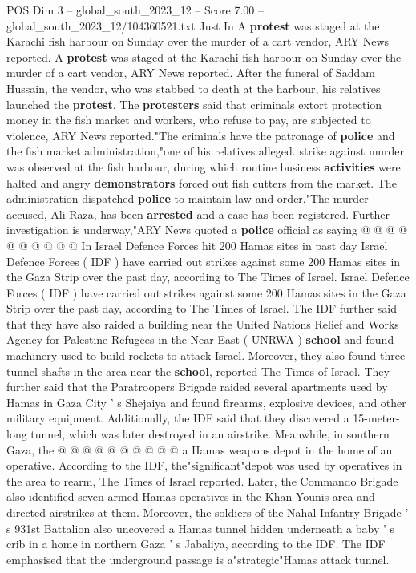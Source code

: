 \begin{textsample}{POS Dim 3 – global\_south\_2023\_12 – Score 7.00 – global\_south\_2023\_12/104360521.txt}  \label{ex:f3_pos_424}
Just In A \textbf{protest} was staged at the Karachi fish harbour on Sunday over the murder of a cart vendor, ARY News reported.
A \textbf{protest} was staged at the Karachi fish harbour on Sunday over the murder of a cart vendor, ARY News reported.
After the funeral of Saddam Hussain, the vendor, who was stabbed to death at the harbour, his relatives launched the \textbf{protest}.
The \textbf{protesters} said that criminals extort protection money in the fish market and workers, who refuse to pay, are subjected to violence, ARY News reported."The criminals have the patronage of \textbf{police} and the fish market administration,"one of his relatives alleged. strike against murder was observed at the fish harbour, during which routine business \textbf{activities} were halted and angry \textbf{demonstrators} forced out fish cutters from the market.
The administration dispatched \textbf{police} to maintain law and order."The murder accused, Ali Raza, has been \textbf{arrested} and a case has been registered.
Further investigation is underway,"ARY News quoted a \textbf{police} official as saying @ @ @ @ @ @ @ @ @ @ In Israel Defence Forces hit 200 Hamas sites in past day Israel Defence Forces ( IDF ) have carried out strikes against some 200 Hamas sites in the Gaza Strip over the past day, according to The Times of Israel.
Israel Defence Forces ( IDF ) have carried out strikes against some 200 Hamas sites in the Gaza Strip over the past day, according to The Times of Israel.
The IDF further said that they have also raided a building near the United Nations Relief and Works Agency for Palestine Refugees in the Near East ( UNRWA ) \textbf{school} and found machinery used to build rockets to attack Israel.
Moreover, they also found three tunnel shafts in the area near the \textbf{school}, reported The Times of Israel.
They further said that the Paratroopers Brigade raided several apartments used by Hamas in Gaza City ' s Shejaiya and found firearms, explosive devices, and other military equipment.
Additionally, the IDF said that they discovered a 15-meter-long tunnel, which was later destroyed in an airstrike.
Meanwhile, in southern Gaza, the @ @ @ @ @ @ @ @ @ @ a Hamas weapons depot in the home of an operative.
According to the IDF, the"significant"depot was used by operatives in the area to rearm, The Times of Israel reported.
Later, the Commando Brigade also identified seven armed Hamas operatives in the Khan Younis area and directed airstrikes at them.
Moreover, the soldiers of the Nahal Infantry Brigade ' s 931st Battalion also uncovered a Hamas tunnel hidden underneath a baby ' s crib in a home in northern Gaza ' s Jabaliya, according to the IDF.
The IDF emphasised that the underground passage is a"strategic"Hamas attack tunnel.

\end{textsample}
